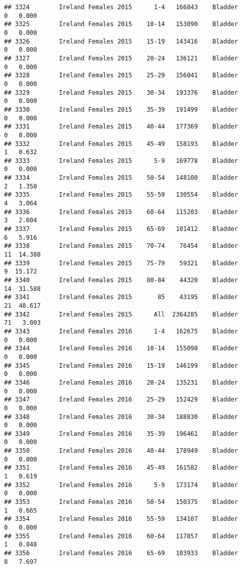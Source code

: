 \documentclass[
]{article}
\begin{document}
\begin{verbatim}
## 3324        Ireland Females 2015      1-4   166843    Bladder      0   0.000
## 3325        Ireland Females 2015    10-14   153090    Bladder      0   0.000
## 3326        Ireland Females 2015    15-19   143416    Bladder      0   0.000
## 3327        Ireland Females 2015    20-24   136121    Bladder      0   0.000
## 3328        Ireland Females 2015    25-29   156041    Bladder      0   0.000
## 3329        Ireland Females 2015    30-34   193376    Bladder      0   0.000
## 3330        Ireland Females 2015    35-39   191499    Bladder      0   0.000
## 3331        Ireland Females 2015    40-44   177369    Bladder      0   0.000
## 3332        Ireland Females 2015    45-49   158193    Bladder      1   0.632
## 3333        Ireland Females 2015      5-9   169778    Bladder      0   0.000
## 3334        Ireland Females 2015    50-54   148100    Bladder      2   1.350
## 3335        Ireland Females 2015    55-59   130554    Bladder      4   3.064
## 3336        Ireland Females 2015    60-64   115203    Bladder      3   2.604
## 3337        Ireland Females 2015    65-69   101412    Bladder      6   5.916
## 3338        Ireland Females 2015    70-74    76454    Bladder     11  14.388
## 3339        Ireland Females 2015    75-79    59321    Bladder      9  15.172
## 3340        Ireland Females 2015    80-84    44320    Bladder     14  31.588
## 3341        Ireland Females 2015       85    43195    Bladder     21  48.617
## 3342        Ireland Females 2015      All  2364285    Bladder     71   3.003
## 3343        Ireland Females 2016      1-4   162675    Bladder      0   0.000
## 3344        Ireland Females 2016    10-14   155098    Bladder      0   0.000
## 3345        Ireland Females 2016    15-19   146199    Bladder      0   0.000
## 3346        Ireland Females 2016    20-24   135231    Bladder      0   0.000
## 3347        Ireland Females 2016    25-29   152429    Bladder      0   0.000
## 3348        Ireland Females 2016    30-34   188830    Bladder      0   0.000
## 3349        Ireland Females 2016    35-39   196461    Bladder      0   0.000
## 3350        Ireland Females 2016    40-44   178949    Bladder      0   0.000
## 3351        Ireland Females 2016    45-49   161582    Bladder      1   0.619
## 3352        Ireland Females 2016      5-9   173174    Bladder      0   0.000
## 3353        Ireland Females 2016    50-54   150375    Bladder      1   0.665
## 3354        Ireland Females 2016    55-59   134107    Bladder      0   0.000
## 3355        Ireland Females 2016    60-64   117857    Bladder      1   0.848
## 3356        Ireland Females 2016    65-69   103933    Bladder      8   7.697

\end{verbatim}
\end{document}
